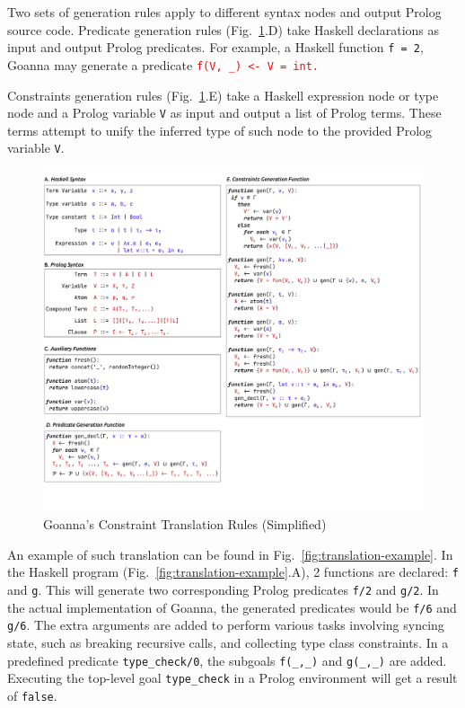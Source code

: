     Two sets of generation rules apply to different syntax nodes and output Prolog source code. Predicate generation rules (Fig.~\ref{fig:translation}.D) take Haskell declarations as input and output Prolog predicates. For example, a Haskell function \texttt{f = 2}, Goanna may generate a predicate \texttt{\textcolor{red}{f(V, \_) <- V = int.}}
    
    Constraints generation rules (Fig.~\ref{fig:translation}.E) take a Haskell expression node or type node and a Prolog variable \texttt{V} as input and output a list of Prolog terms. These terms attempt to unify the inferred type of such node to the provided Prolog variable \texttt{V}.
    
    \begin{figure}[ht!]
        \centering
        \includegraphics[width=\linewidth,trim={0 6cm 0 0},clip]{images/Generation}
        \caption{Goanna's Constraint Translation Rules (Simplified)} 
        \label{fig:translation}
    \end{figure}
    
  
    An example of such translation can be found in Fig.~\ref{fig:translation-example}. In the Haskell program (Fig.~\ref{fig:translation-example}.A), 2 functions are declared: \texttt{f} and \texttt{g}. This will generate two corresponding Prolog predicates \texttt{f/2} and \texttt{g/2}. In the actual implementation of Goanna, the generated predicates would be \texttt{f/6} and \texttt{g/6}. The extra arguments are added to perform various tasks involving syncing state, such as breaking recursive calls, and collecting type class constraints. In a predefined predicate \texttt{type\_check/0}, the subgoals \texttt{f(\_,\_)} and \texttt{g(\_,\_)} are added. Executing the top-level goal \texttt{type\_check} in a Prolog environment will get a result of \texttt{false}.
    
